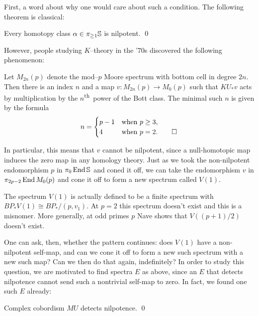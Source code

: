 First, a word about why one would care about such a condition.  The following theorem is classical:
\begin{theorem}[Nishida]
Every homotopy class $\alpha \in \pi_{\ge 1} \S$ is nilpotent. \qed
\end{theorem}

\noindent However, people studying $K$--theory in the '$70$s discovered the following phenomenon:

\begin{theorem}[Adams]
Let $M_{2n}(p)$ denote the mod--$p$ Moore spectrum with bottom cell in degree $2n$.  Then there is an index $n$ and a map $v: M_{2n}(p) \to M_0(p)$ such that $KU_* v$ acts by multiplication by the $n$\textsuperscript{th}\, power of the Bott class.  The minimal such $n$ is given by the formula \[n = \begin{cases} p-1 & \text{when $p \ge 3$}, \\ 4 & \text{when $p = 2$}. \qed \end{cases}\]
\end{theorem}

\noindent In particular, this means that $v$ cannot be nilpotent, since a null-homotopic map induces the zero map in any homology theory.  Just as we took the non-nilpotent endomorphism $p$ in $\pi_0 \End \S$ and coned it off, we can take the endomorphism $v$ in $\pi_{2p-2} \End M_0(p)$ and cone it off to form a new spectrum called $V(1)$.

\begin{remark}
The spectrum $V(1)$ is actually defined to be a finite spectrum with $BP_* V(1) \cong BP_* / (p, v_1)$. At $p = 2$ this spectrum doesn't exist and this is a misnomer.  More generally, at odd primes $p$ Nave shows that $V((p+1)/2)$ doesn't exist.
\end{remark}

One can ask, then, whether the pattern continues: does $V(1)$ have a non-nilpotent self-map, and can we cone it off to form a new such spectrum with a new such map?  Can we then do that again, indefinitely?  In order to study this question, we are motivated to find spectra $E$ as above, since an $E$ that detects nilpotence cannot send such a nontrivial self-map to zero.  In fact, we found one such $E$ already:

\begin{theorem}\label{DevinatzHopkinsSmith}
Complex cobordism $MU$ detects nilpotence. \qed
\end{theorem}

